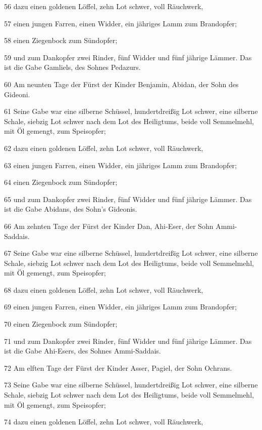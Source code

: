 \par 56 dazu einen goldenen Löffel, zehn Lot schwer, voll Räuchwerk,
\par 57 einen jungen Farren, einen Widder, ein jähriges Lamm zum Brandopfer;
\par 58 einen Ziegenbock zum Sündopfer;
\par 59 und zum Dankopfer zwei Rinder, fünf Widder und fünf jährige Lämmer. Das ist die Gabe Gamliels, des Sohnes Pedazurs.
\par 60 Am neunten Tage der Fürst der Kinder Benjamin, Abidan, der Sohn des Gideoni.
\par 61 Seine Gabe war eine silberne Schüssel, hundertdreißig Lot schwer, eine silberne Schale, siebzig Lot schwer nach dem Lot des Heiligtums, beide voll Semmelmehl, mit Öl gemengt, zum Speisopfer;
\par 62 dazu einen goldenen Löffel, zehn Lot schwer, voll Räuchwerk,
\par 63 einen jungen Farren, einen Widder, ein jähriges Lamm zum Brandopfer;
\par 64 einen Ziegenbock zum Sündopfer;
\par 65 und zum Dankopfer zwei Rinder, fünf Widder und fünf jährige Lämmer. Das ist die Gabe Abidans, des Sohn's Gideonis.
\par 66 Am zehnten Tage der Fürst der Kinder Dan, Ahi-Eser, der Sohn Ammi-Saddais.
\par 67 Seine Gabe war eine silberne Schüssel, hundertdreißig Lot schwer, eine silberne Schale, siebzig Lot schwer nach dem Lot des Heiligtums, beide voll Semmelmehl, mit Öl gemengt, zum Speisopfer;
\par 68 dazu einen goldenen Löffel, zehn Lot schwer, voll Räuchwerk,
\par 69 einen jungen Farren, einen Widder, ein jähriges Lamm zum Brandopfer;
\par 70 einen Ziegenbock zum Sündopfer;
\par 71 und zum Dankopfer zwei Rinder, fünf Widder und fünf jährige Lämmer. Das ist die Gabe Ahi-Esers, des Sohnes Ammi-Saddais.
\par 72 Am elften Tage der Fürst der Kinder Asser, Pagiel, der Sohn Ochrans.
\par 73 Seine Gabe war eine silberne Schüssel, hundertdreißig Lot schwer, eine silberne Schale, siebzig Lot schwer nach dem Lot des Heiligtums, beide voll Semmelmehl, mit Öl gemengt, zum Speisopfer;
\par 74 dazu einen goldenen Löffel, zehn Lot schwer, voll Räuchwerk,
